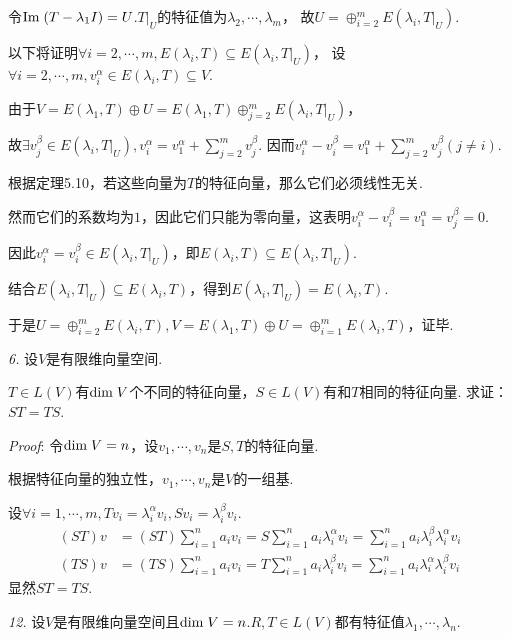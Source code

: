 令$\mathrm{Im \;}(T-\lambda_1 I)=U$.$T|_U$的特征值为$\lambda_2,\cdots,\lambda_m$，
故$U=\oplus_{i=2}^m E(\lambda_i,T|_U)$.

以下将证明$\forall i=2,\cdots,m,E(\lambda_i,T) \subseteq E(\lambda_i,T|_U)$，
设$\forall i=2,\cdots,m,v_i^\alpha \in E(\lambda_i,T) \subseteq V$.

由于$V=E(\lambda_1,T) \oplus U=E(\lambda_1,T) \oplus_{j=2}^m E(\lambda_i,T|_U)$，

故$\exists v_j^\beta \in E(\lambda_i,T|_U),v_i^\alpha=v_1^\alpha+\sum_{j=2}^m v_j^\beta$.
因而$v_i^\alpha-v_i^\beta=v_1^\alpha+\sum_{j=2}^m v_j^\beta(j \ne i)$.

根据定理5.10，若这些向量为$T$的特征向量，那么它们必须线性无关.

然而它们的系数均为$1$，因此它们只能为零向量，这表明$v_i^\alpha-v_i^\beta=v_1^\alpha=v_j^\beta=0$.

因此$v_i^\alpha=v_i^\beta \in E(\lambda_i,T|_U)$，即$E(\lambda_i,T) \subseteq E(\lambda_i,T|_U)$.

结合$E(\lambda_i,T|_U) \subseteq E(\lambda_i,T)$，得到$E(\lambda_i,T|_U)=E(\lambda_i,T)$.

于是$U=\oplus_{i=2}^m E(\lambda_i,T),V=E(\lambda_1,T) \oplus U=\oplus_{i=1}^m E(\lambda_i,T)$，证毕.

\newpage

\textit{6.}
设$V$是有限维向量空间.

$T \in L(V)$有$\mathrm{dim \;} V$个不同的特征向量，$S \in L(V)$有和$T$相同的特征向量.
求证：$ST=TS$.

\textit{Proof}:
令$\mathrm{dim \;} V=n$，设$v_1,\cdots,v_n$是$S,T$的特征向量.

根据特征向量的独立性，$v_1,\cdots,v_n$是$V$的一组基.

设$\forall i=1,\cdots,m,Tv_i=\lambda_i^\alpha v_i,Sv_i=\lambda_i^\beta v_i$.
    \begin{align*}
        (ST)v &=(ST)\sum_{i=1}^n a_iv_i=S\sum_{i=1}^n a_i \lambda_i^\alpha v_i
                =\sum_{i=1}^n a_i \lambda_i^\beta \lambda_i^\alpha v_i \\
        (TS)v &=(TS)\sum_{i=1}^n a_iv_i=T\sum_{i=1}^n a_i \lambda_i^\beta v_i
                =\sum_{i=1}^n a_i \lambda_i^\alpha \lambda_i^\beta v_i
    \end{align*}
显然$ST=TS$.

\hspace*{\fill}

\textit{12.}
设$V$是有限维向量空间且$\mathrm{dim \;} V=n$.$R,T \in L(V)$都有特征值$\lambda_1,\cdots,\lambda_n$.

